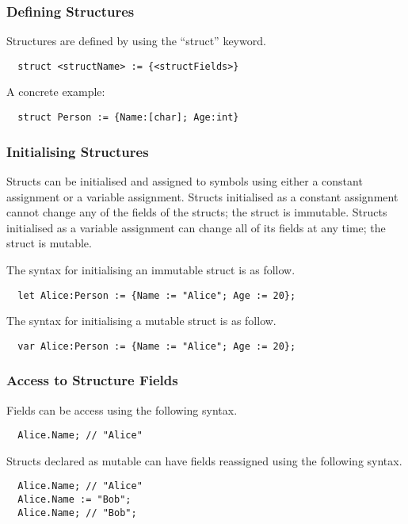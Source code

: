 \subsubsection{Defining Structures}
\label{sec:defStructures}

Structures are defined by using the \enquote{struct} keyword. 

\begin{verbatim}
  struct <structName> := {<structFields>}
\end{verbatim}

A concrete example:

\begin{verbatim}
  struct Person := {Name:[char]; Age:int}
\end{verbatim}

\subsubsection{Initialising Structures}
\label{sec:initStructures}

Structs can be initialised and assigned to symbols using either a constant assignment or a variable assignment. Structs initialised as a constant assignment cannot change any of the fields of the structs; the struct is immutable. Structs initialised as a variable assignment can change all of its fields at any time; the struct is mutable.

The syntax for initialising an immutable struct is as follow.

\begin{verbatim}
  let Alice:Person := {Name := "Alice"; Age := 20};
\end{verbatim}

The syntax for initialising a mutable struct is as follow.

\begin{verbatim}
  var Alice:Person := {Name := "Alice"; Age := 20};
\end{verbatim}

\subsubsection{Access to Structure Fields}
\label{sec:accessStructFields}

Fields can be access using the following syntax.

\begin{verbatim}
  Alice.Name; // "Alice"
\end{verbatim}

Structs declared as mutable can have fields reassigned using the following syntax.

\begin{verbatim}
  Alice.Name; // "Alice"
  Alice.Name := "Bob";
  Alice.Name; // "Bob";
\end{verbatim}